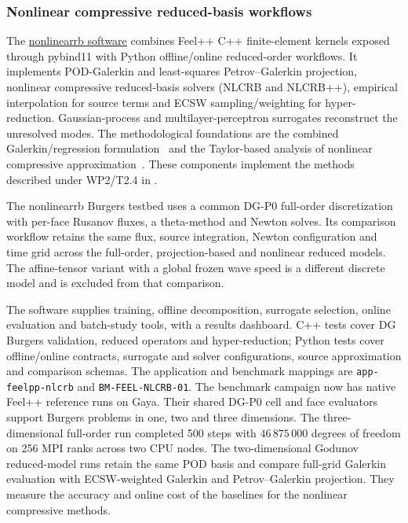 \subsubsection{Nonlinear compressive reduced-basis workflows}
\label{sec:Feelpp:implementation-2026:nlrb}
The \href{https://github.com/feelpp/nonlinearrb}{nonlinearrb software}
combines Feel++ C++ finite-element kernels exposed through pybind11 with
Python offline/online reduced-order workflows. It implements POD-Galerkin
and least-squares Petrov--Galerkin projection, nonlinear compressive
reduced-basis solvers (NLCRB and NLCRB++), empirical interpolation for source
terms and ECSW sampling/weighting for hyper-reduction. Gaussian-process
and multilayer-perceptron surrogates reconstruct the unresolved modes.
The methodological foundations are the combined Galerkin/regression
formulation~\cite{hal_05143191} and the Taylor-based analysis of nonlinear
compressive approximation~\cite{hal_05466017}.
These components implement the methods described under WP2/T2.4 in
.

The nonlinearrb Burgers testbed uses a common DG-P0 full-order discretization with
per-face Rusanov fluxes, a theta-method and Newton solves. Its comparison
workflow retains the same flux, source integration, Newton configuration
and time grid across the full-order, projection-based and nonlinear
reduced models. The affine-tensor variant with a global frozen wave speed
is a different discrete model and is excluded from that comparison.

The software supplies training, offline decomposition, surrogate selection,
online evaluation and batch-study tools, with a results dashboard.
C++ tests cover DG Burgers validation, reduced operators and hyper-reduction;
Python tests cover offline/online contracts, surrogate and solver
configurations, source approximation and comparison schemas.
The application and benchmark mappings are
\texttt{app-feelpp-nlcrb} and \texttt{BM-FEEL-NLCRB-01}. The benchmark campaign
now has native Feel++ reference runs on Gaya. Their shared DG-P0 cell and
face evaluators support Burgers problems in one, two and three dimensions.
The three-dimensional full-order run completed 500 steps with
$46\,875\,000$ degrees of freedom on 256 MPI ranks across two CPU nodes.
The two-dimensional Godunov reduced-model runs retain the same POD basis and
compare full-grid Galerkin evaluation with ECSW-weighted Galerkin and
Petrov--Galerkin projection. They measure the accuracy and online cost of
the baselines for the nonlinear compressive methods.

